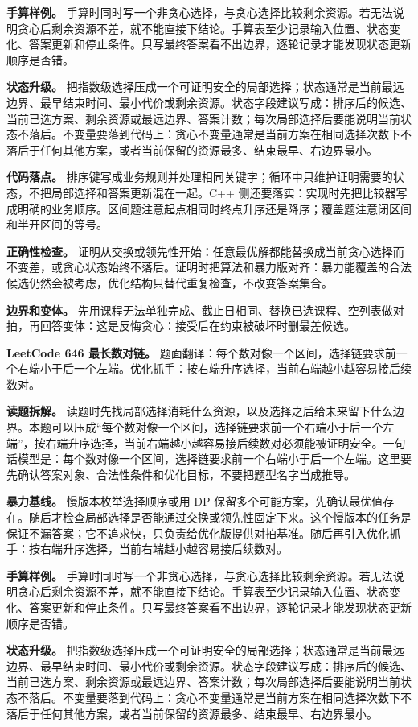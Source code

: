 \textbf{手算样例。} 手算时同时写一个非贪心选择，与贪心选择比较剩余资源。若无法说明贪心后剩余资源不差，就不能直接下结论。手算表至少记录输入位置、状态变化、答案更新和停止条件。只写最终答案看不出边界，逐轮记录才能发现状态更新顺序是否错。

\textbf{状态升级。} 把指数级选择压成一个可证明安全的局部选择；状态通常是当前最远边界、最早结束时间、最小代价或剩余资源。状态字段建议写成：排序后的候选、当前已选方案、剩余资源或最远边界、答案计数；每次局部选择后要能说明当前状态不落后。不变量要落到代码上：贪心不变量通常是当前方案在相同选择次数下不落后于任何其他方案，或者当前保留的资源最多、结束最早、右边界最小。

\textbf{代码落点。} 排序键写成业务规则并处理相同关键字；循环中只维护证明需要的状态，不把局部选择和答案更新混在一起。C++ 侧还要落实：实现时先把比较器写成明确的业务顺序。区间题注意起点相同时终点升序还是降序；覆盖题注意闭区间和半开区间的等号。

\textbf{正确性检查。} 证明从交换或领先性开始：任意最优解都能替换成当前贪心选择而不变差，或贪心状态始终不落后。证明时把算法和暴力版对齐：暴力能覆盖的合法候选仍然会被考虑，优化结构只替代重复检查，不改变答案集合。

\textbf{边界和变体。} 先用课程无法单独完成、截止日相同、替换已选课程、空列表做对拍，再回答变体：这是反悔贪心：接受后在约束被破坏时删最差候选。

\noindent\textbf{LeetCode 646 最长数对链。} 题面翻译：每个数对像一个区间，选择链要求前一个右端小于后一个左端。优化抓手：按右端升序选择，当前右端越小越容易接后续数对。

\textbf{读题拆解。} 读题时先找局部选择消耗什么资源，以及选择之后给未来留下什么边界。本题可以压成“每个数对像一个区间，选择链要求前一个右端小于后一个左端”，按右端升序选择，当前右端越小越容易接后续数对必须能被证明安全。一句话模型是：每个数对像一个区间，选择链要求前一个右端小于后一个左端。这里要先确认答案对象、合法性条件和优化目标，不要把题型名字当成推导。

\textbf{暴力基线。} 慢版本枚举选择顺序或用 DP 保留多个可能方案，先确认最优值存在。随后才检查局部选择是否能通过交换或领先性固定下来。这个慢版本的任务是保证不漏答案；它不追求快，只负责给优化版提供对拍基准。随后再引入优化抓手：按右端升序选择，当前右端越小越容易接后续数对。

\textbf{手算样例。} 手算时同时写一个非贪心选择，与贪心选择比较剩余资源。若无法说明贪心后剩余资源不差，就不能直接下结论。手算表至少记录输入位置、状态变化、答案更新和停止条件。只写最终答案看不出边界，逐轮记录才能发现状态更新顺序是否错。

\textbf{状态升级。} 把指数级选择压成一个可证明安全的局部选择；状态通常是当前最远边界、最早结束时间、最小代价或剩余资源。状态字段建议写成：排序后的候选、当前已选方案、剩余资源或最远边界、答案计数；每次局部选择后要能说明当前状态不落后。不变量要落到代码上：贪心不变量通常是当前方案在相同选择次数下不落后于任何其他方案，或者当前保留的资源最多、结束最早、右边界最小。

